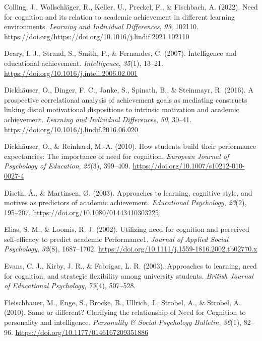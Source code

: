 \documentclass[
  man]{apa6}
\newlength{\cslhangindent}
\newlength{\cslentryspacingunit} %
\newenvironment{CSLReferences}[2] %
 {%
  \setlength{\parindent}{0pt}
  \ifodd #1
  \let\oldpar\par
  \def\par{\hangindent=\cslhangindent\oldpar}
  \fi
  \setlength{\parskip}{#2\cslentryspacingunit}
 }%
 {}
\begin{document}
\begin{CSLReferences}{1}{0}
\leavevmode{}%
Colling, J., Wollschläger, R., Keller, U., Preckel, F., \& Fischbach, A. (2022). Need for cognition and its relation to academic achievement in different learning environments. \emph{Learning and Individual Differences}, \emph{93}, 102110. https://doi.org/\url{https://doi.org/10.1016/j.lindif.2021.102110}

\leavevmode{}%
Deary, I. J., Strand, S., Smith, P., \& Fernandes, C. (2007). Intelligence and educational achievement. \emph{Intelligence}, \emph{35}(1), 13--21. \url{https://doi.org/10.1016/j.intell.2006.02.001}

\leavevmode{}%
Dickhäuser, O., Dinger, F. C., Janke, S., Spinath, B., \& Steinmayr, R. (2016). A prospective correlational analysis of achievement goals as mediating constructs linking distal motivational dispositions to intrinsic motivation and academic achievement. \emph{Learning and Individual Differences}, \emph{50}, 30--41. \url{https://doi.org/10.1016/j.lindif.2016.06.020}

\leavevmode{}%
Dickhäuser, O., \& Reinhard, M.-A. (2010). How students build their performance expectancies: The importance of need for cognition. \emph{European Journal of Psychology of Education}, \emph{25}(3), 399--409. \url{https://doi.org/10.1007/s10212-010-0027-4}

\leavevmode{}%
Diseth, Å., \& Martinsen, Ø. (2003). Approaches to learning, cognitive style, and motives as predictors of academic achievement. \emph{Educational Psychology}, \emph{23}(2), 195--207. \url{https://doi.org/10.1080/01443410303225}

\leavevmode{}%
Elias, S. M., \& Loomis, R. J. (2002). Utilizing need for cognition and perceived self-efficacy to predict academic Performance1. \emph{Journal of Applied Social Psychology}, \emph{32}(8), 1687--1702. \url{https://doi.org/10.1111/j.1559-1816.2002.tb02770.x}

\leavevmode{}%
Evans, C. J., Kirby, J. R., \& Fabrigar, L. R. (2003). Approaches to learning, need for cognition, and strategic flexibility among university students. \emph{British Journal of Educational Psychology}, \emph{73}(4), 507--528.

\leavevmode{}%
Fleischhauer, M., Enge, S., Brocke, B., Ullrich, J., Strobel, A., \& Strobel, A. (2010). Same or different? Clarifying the relationship of {N}eed for {C}ognition to personality and intelligence. \emph{Personality \& Social Psychology Bulletin}, \emph{36}(1), 82--96. \url{https://doi.org/10.1177/0146167209351886}


\end{CSLReferences}
\end{document}
